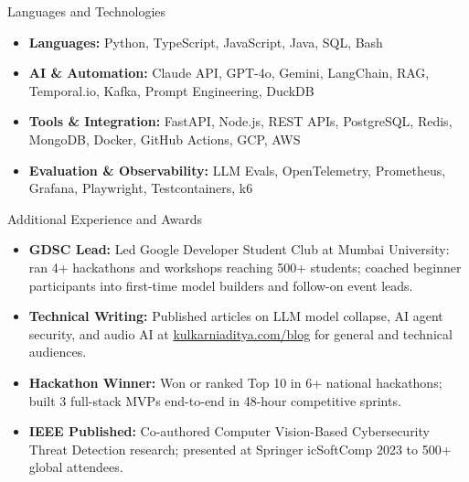 \documentclass[]{mcdowellcv}
\begin{document}
\begin{cvsection}{Languages and Technologies}
  \begin{cvsubsection}{}{}{}
    \begin{itemize}
      \item \textbf{Languages:} Python, TypeScript, JavaScript, Java, SQL, Bash
      \item \textbf{AI \& Automation:} Claude API, GPT-4o, Gemini, LangChain, RAG, Temporal.io, Kafka, Prompt Engineering, DuckDB
      \item \textbf{Tools \& Integration:} FastAPI, Node.js, REST APIs, PostgreSQL, Redis, MongoDB, Docker, GitHub Actions, GCP, AWS
      \item \textbf{Evaluation \& Observability:} LLM Evals, OpenTelemetry, Prometheus, Grafana, Playwright, Testcontainers, k6
    \end{itemize}
  \end{cvsubsection}
\end{cvsection}

\begin{cvsection}{Additional Experience and Awards}
  \begin{cvsubsection}{}{}{}
    \begin{itemize}
      \item \textbf{GDSC Lead:} Led Google Developer Student Club at Mumbai University: ran 4+ hackathons and workshops reaching 500+ students; coached beginner participants into first-time model builders and follow-on event leads.
      \item \textbf{Technical Writing:} Published articles on LLM model collapse, AI agent security, and audio AI at \href{https://www.kulkarniaditya.com/blog}{kulkarniaditya.com/blog} for general and technical audiences.
      \item \textbf{Hackathon Winner:} Won or ranked Top 10 in 6+ national hackathons; built 3 full-stack MVPs end-to-end in 48-hour competitive sprints.
      \item \textbf{IEEE Published:} Co-authored Computer Vision-Based Cybersecurity Threat Detection research; presented at Springer icSoftComp 2023 to 500+ global attendees.
    \end{itemize}
  \end{cvsubsection}
\end{cvsection}
\end{document}
